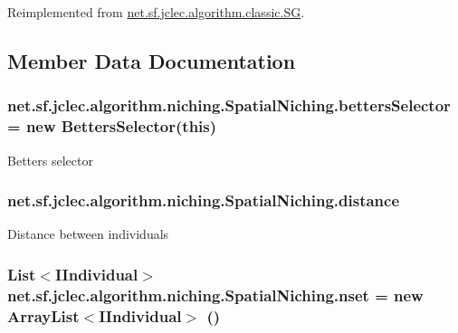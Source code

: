 Reimplemented from \hyperlink{classnet_1_1sf_1_1jclec_1_1algorithm_1_1classic_1_1_s_g_a3d948a919967ee8095ec90580e45e985}{net.\-sf.\-jclec.\-algorithm.\-classic.\-S\-G}.



\subsection{Member Data Documentation}
\hypertarget{classnet_1_1sf_1_1jclec_1_1algorithm_1_1niching_1_1_spatial_niching_ae6a29d4d4e00e575da303152f7ad93c8}{
\subsubsection[{betters\-Selector}]{ net.\-sf.\-jclec.\-algorithm.\-niching.\-Spatial\-Niching.\-betters\-Selector = new {\bf Betters\-Selector}(this)\hspace{0.3cm}{\ttfamily [protected]}}}\label{classnet_1_1sf_1_1jclec_1_1algorithm_1_1niching_1_1_spatial_niching_ae6a29d4d4e00e575da303152f7ad93c8}
Betters selector \hypertarget{classnet_1_1sf_1_1jclec_1_1algorithm_1_1niching_1_1_spatial_niching_a53db55aa230eb736bb37523c75dae0d8}{
\subsubsection[{distance}]{ net.\-sf.\-jclec.\-algorithm.\-niching.\-Spatial\-Niching.\-distance\hspace{0.3cm}{\ttfamily [protected]}}}\label{classnet_1_1sf_1_1jclec_1_1algorithm_1_1niching_1_1_spatial_niching_a53db55aa230eb736bb37523c75dae0d8}
Distance between individuals \hypertarget{classnet_1_1sf_1_1jclec_1_1algorithm_1_1niching_1_1_spatial_niching_aaf5339850d7394348a6312c6ef7e4a4d}{
\subsubsection[{nset}]{\setlength{\rightskip}{0pt plus 5cm}List$<${\bf I\-Individual}$>$ net.\-sf.\-jclec.\-algorithm.\-niching.\-Spatial\-Niching.\-nset = new Array\-List$<${\bf I\-Individual}$>$ ()\hspace{0.3cm}{\ttfamily [protected]}}}\label{classnet_1_1sf_1_1jclec_1_1algorithm_1_1niching_1_1_spatial_niching_aaf5339850d7394348a6312c6ef7e4a4d}
